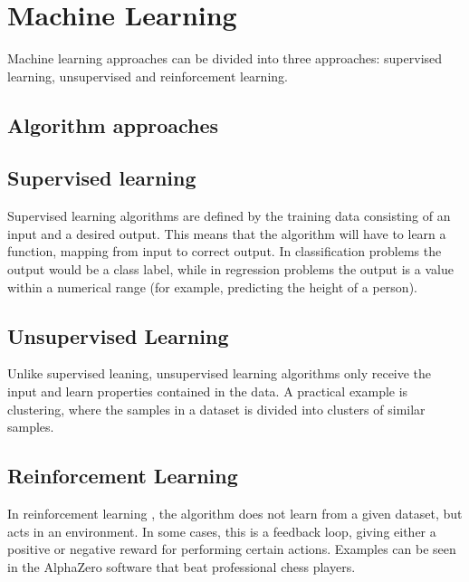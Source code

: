 \section{Machine Learning} \label{Machine Learning}
    Machine learning approaches can be divided into three approaches\cite{Goodfellow-et-al-2016_E}: supervised learning, unsupervised and reinforcement learning. 
    
    \subsection{Algorithm approaches} \label{Algorithm types}
        \subsection{Supervised learning}
            Supervised learning \cite{Goodfellow-et-al-2016_E} algorithms are defined by the training data consisting of an input and a desired output. This means that the algorithm will have to learn a function, mapping from input to correct output. In classification problems the output would be a class label, while in regression problems the output is a value within a numerical range (for example, predicting the height of a person).
            
        \subsection{Unsupervised Learning}
            Unlike supervised leaning, unsupervised learning algorithms only receive the input and learn properties contained in the data\cite{Goodfellow-et-al-2016_E}. A practical example is clustering, where the samples in a dataset is divided into clusters of similar samples. 
                
        \subsection{Reinforcement Learning}
            In reinforcement learning \cite{Goodfellow-et-al-2016_E}, the algorithm does not learn from a given dataset, but acts in an environment. In some cases, this is a feedback loop, giving either a positive or negative reward for performing certain actions. Examples can be seen in the AlphaZero software that beat professional chess players\cite{silver2017mastering}.
    

